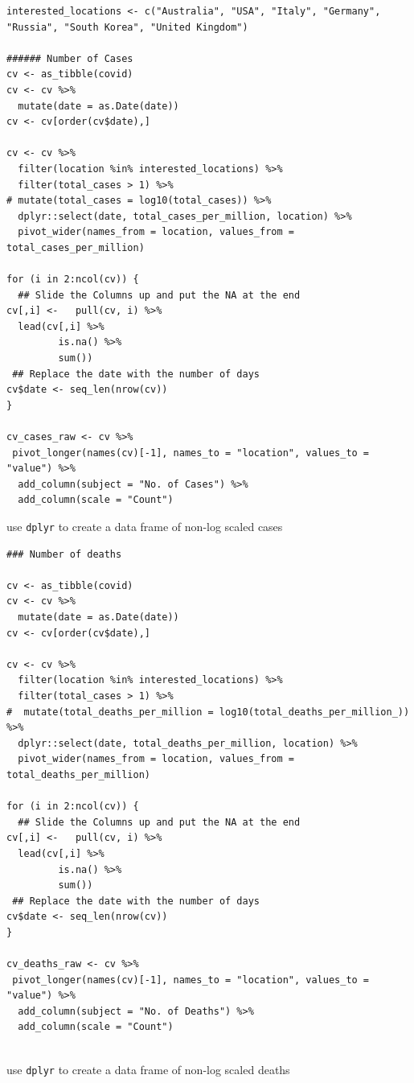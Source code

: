 \documentclass[11pt]{article}
\begin{document}
\begin{listing}[htbp]
\begin{verbatim}
interested_locations <- c("Australia", "USA", "Italy", "Germany", "Russia", "South Korea", "United Kingdom")

###### Number of Cases
cv <- as_tibble(covid)
cv <- cv %>%
  mutate(date = as.Date(date))
cv <- cv[order(cv$date),]

cv <- cv %>%
  filter(location %in% interested_locations) %>%
  filter(total_cases > 1) %>%
# mutate(total_cases = log10(total_cases)) %>%
  dplyr::select(date, total_cases_per_million, location) %>%
  pivot_wider(names_from = location, values_from = total_cases_per_million)

for (i in 2:ncol(cv)) {
  ## Slide the Columns up and put the NA at the end
cv[,i] <-   pull(cv, i) %>%
  lead(cv[,i] %>%
         is.na() %>%
         sum())
 ## Replace the date with the number of days
cv$date <- seq_len(nrow(cv))
}

cv_cases_raw <- cv %>%
 pivot_longer(names(cv)[-1], names_to = "location", values_to = "value") %>%
  add_column(subject = "No. of Cases") %>%
  add_column(scale = "Count")

\end{verbatim}
\caption{\label{orge5f6201}use \texttt{dplyr} to create a data frame of non-log scaled cases}
\end{listing}

\begin{listing}[htbp]
\begin{verbatim}
### Number of deaths

cv <- as_tibble(covid)
cv <- cv %>%
  mutate(date = as.Date(date))
cv <- cv[order(cv$date),]

cv <- cv %>%
  filter(location %in% interested_locations) %>%
  filter(total_cases > 1) %>%
#  mutate(total_deaths_per_million = log10(total_deaths_per_million_)) %>%
  dplyr::select(date, total_deaths_per_million, location) %>%
  pivot_wider(names_from = location, values_from = total_deaths_per_million)

for (i in 2:ncol(cv)) {
  ## Slide the Columns up and put the NA at the end
cv[,i] <-   pull(cv, i) %>%
  lead(cv[,i] %>%
         is.na() %>%
         sum())
 ## Replace the date with the number of days
cv$date <- seq_len(nrow(cv))
}

cv_deaths_raw <- cv %>%
 pivot_longer(names(cv)[-1], names_to = "location", values_to = "value") %>%
  add_column(subject = "No. of Deaths") %>%
  add_column(scale = "Count")


\end{verbatim}
\caption{\label{orgb13ebcd}use \texttt{dplyr} to create a data frame of non-log scaled deaths}
\end{listing}
\end{document}
